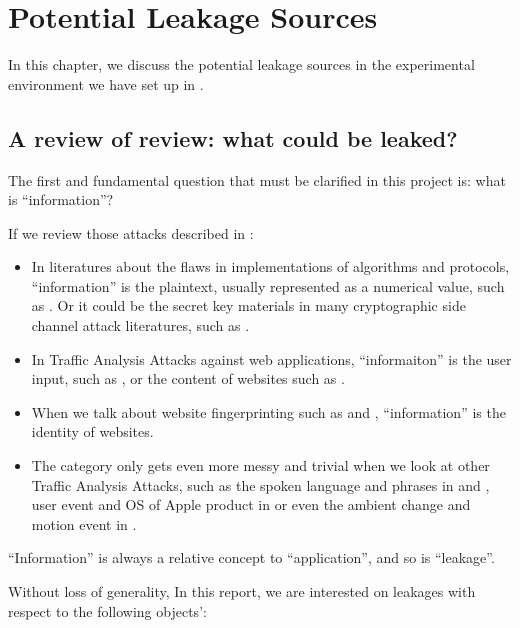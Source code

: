 \chapter{Potential Leakage Sources}

In this chapter, we discuss the potential leakage sources in the experimental environment we have set up in . 

\section{A review of review: what could be leaked?} \label{Sec: A Review of Review}

The first and fundamental question that must be clarified in this project is: what is ``information''?

If we review those attacks described in :

\begin{itemize}
	\item In literatures about the flaws in implementations of algorithms and protocols, ``information'' is the plaintext, usually represented as a numerical value, such as \cite{802154sec} \cite{rfc7457} \cite{CompressionRatioAttack} \cite{PaddingOracle}. Or it could be the secret key materials in many cryptographic side channel attack literatures, such as \cite{DPA}.
	\item In Traffic Analysis Attacks against web applications, ``informaiton'' is the user input, such as \cite{PinpointWeb} \cite{SearchAttack}, or the content of websites such as \cite{WebSideChannel}.
	\item When we talk about website fingerprinting such as \cite{WebsiteFingerprint} \cite{Peekaboo} and \cite{PClassifier}, ``information'' is the identity of websites. 
	\item The category only gets even more messy and trivial when we look at other Traffic Analysis Attacks, such as the spoken language and phrases in \cite{VoIPLanguage} and \cite{VoIPPhrases}, user event and OS of Apple product in \cite{AppleMessage} or even the ambient change and motion event in \cite{Video}.
\end{itemize}

``Information'' is always a relative concept to ``application'', and so is ``leakage''. 

Without loss of generality, In this report, we are interested on leakages with respect to the following objects':

